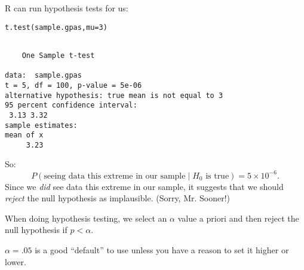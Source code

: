 \documentclass{beamer}\usepackage[]{graphicx}\usepackage[]{color}
\makeatletter
\newcommand{\hlnum}[1]{\textcolor[rgb]{0.824,0.412,0.118}{#1}}%
\newcommand{\hlstd}[1]{\textcolor[rgb]{1,0.894,0.769}{#1}}%
\newcommand{\hlkwc}[1]{\textcolor[rgb]{0.78,0.941,0.545}{#1}}%
\newcommand{\hlkwd}[1]{\textcolor[rgb]{1,0.78,0.769}{#1}}%
\newenvironment{kframe}{%
 \def\at@end@of@kframe{}%
 \ifinner\ifhmode%
  \def\at@end@of@kframe{\end{minipage}}%
  \begin{minipage}{\columnwidth}%
 \fi\fi%
 \def\FrameCommand##1{\hskip\@totalleftmargin \hskip-\fboxsep
 \colorbox{shadecolor}{##1}\hskip-\fboxsep
     \hskip-\linewidth \hskip-\@totalleftmargin \hskip\columnwidth}%
 \MakeFramed {\advance\hsize-\width
   \@totalleftmargin\z@ \linewidth\hsize
   \@setminipage}}%
 {\par\unskip\endMakeFramed%
 \at@end@of@kframe}
\newenvironment{knitrout}{}{} %
\makeatother
\begin{document}
\begin{darkframes}
\begin{frame}[fragile]
R can run hypothesis tests for us:
\begin{knitrout}
\begin{kframe}
\begin{alltt}
\hlkwd{t.test}\hlstd{(sample.gpas,} \hlkwc{mu}\hlstd{=}\hlnum{3}\hlstd{)}
\end{alltt}
\begin{verbatim}

	One Sample t-test

data:  sample.gpas
t = 5, df = 100, p-value = 5e-06
alternative hypothesis: true mean is not equal to 3
95 percent confidence interval:
 3.13 3.32
sample estimates:
mean of x 
     3.23 
\end{verbatim}
\end{kframe}
\end{knitrout}
\end{frame}


\begin{frame}
So:
\[
  P(\text{seeing data this extreme in our sample} \mid \text{$H_0$ is true}) = 5 \times 10^{-6}.
\]
\pause
Since we \emph{did} see data this extreme in our sample, it suggests that we should \emph{reject} the null hypothesis as implausible. (Sorry, Mr. Sooner!)
\pause\bigskip

When doing hypothesis testing, we select an $\alpha$ value a priori and then reject the null hypothesis if $p<\alpha$.
\pause\bigskip

$\alpha=.05$ is a good ``default'' to use unless you have a reason to set it higher or lower.
\end{frame}

\end{darkframes}
\end{document}

